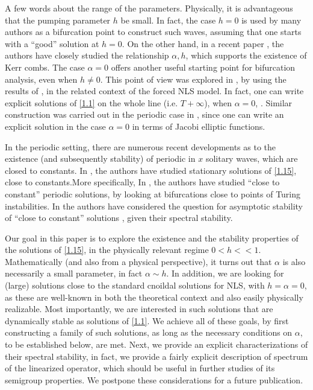 \documentclass[12pt]{amsart}
\theoremstyle{definition}
\theoremstyle{remark}
\numberwithin{equation}{section}
\renewcommand{\(}{\left(}
\renewcommand{\)}{\right)}
\renewcommand{\[}{\left[}
\renewcommand{\]}{\right]}
\newcommand{\al}{\alpha}
\begin{document}
A few words about the range of the parameters. Physically, it is advantageous  that the pumping parameter $h$ be small. In fact, the case $h=0$ is used by many authors as a bifurcation point to construct such waves, assuming that one starts with a ``good''  solution at $h=0$. On the other hand, in a recent paper \cite{MR}, the authors have closely  studied the relationship $\al, h$, which supports the existence of Kerr combs. The case $\al=0$ offers another useful starting point for bifurcation analysis, even when $h\neq 0$. This point of view was explored in \cite{Matsko}, by using the results of \cite{BS}, in the related context of the forced NLS model. In fact, one can write explicit solutions of \eqref{1.1} on the whole line (i.e. $T+\infty$), when $\al=0$, \cite{BS}.  Similar construction was carried out in the periodic case in  \cite{QDM}, since one can write an explicit solution in the case $\al=0$ in terms of Jacobi elliptic functions.

In the periodic setting, there are numerous recent developments as to the existence (and subsequently stability) of periodic in $x$ solitary waves, which are closed to constants. In \cite{QDM, MOT, DH, DH1}, the authors have studied stationary solutions of \eqref{1.15}, close to constants.More specifically,  In \cite{DH, DH1}, the authors have studied ``close to constant'' periodic solutions, by looking at bifurcations close to points of Turing instabilities.  In \cite{MOT} the authors have considered the question for asymptotic stability of ``close to  constant''  solutions , given their spectral stability.

Our goal in this paper is to explore the existence and the stability properties of the solutions of \eqref{1.15}, in the physically relevant regime $0<h<<1$.   Mathematically (and also from a physical perspective), it turns out that $\al$ is also necessarily a  small parameter, in fact $\al\sim h$. In addition, we are looking for (large) solutions close to the standard cnoildal solutions for NLS, with $h=\al=0$, as these are well-known in both the theoretical  context and also easily physically realizable. Most importantly, we are interested in such solutions that are dynamically stable as solutions of \eqref{1.1}. We achieve all of these goals, by first constructing a family of such solutions, as long as the necessary conditions on $\al$, to be established below, are met. Next, we provide an explicit characterizations of their spectral stability, in fact, we provide a fairly explicit description of spectrum of the linearized operator, which should be useful in further studies of its semigroup properties. We postpone these considerations for a  future publication.
\end{document}
